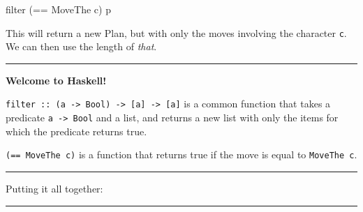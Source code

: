 \documentclass[]{article}
\newenvironment{Shaded}{}{}
\newcommand{\KeywordTok}[1]{\textcolor[rgb]{0.00,0.44,0.13}{\textbf{{#1}}}}
\newcommand{\DataTypeTok}[1]{\textcolor[rgb]{0.56,0.13,0.00}{{#1}}}
\newcommand{\OtherTok}[1]{\textcolor[rgb]{0.00,0.44,0.13}{{#1}}}
\newcommand{\FunctionTok}[1]{\textcolor[rgb]{0.02,0.16,0.49}{{#1}}}
\newcommand{\NormalTok}[1]{{#1}}
\begin{document}
\begin{Shaded}
\begin{Highlighting}[]
\NormalTok{filter (}\FunctionTok{==} \DataTypeTok{MoveThe} \NormalTok{c) p}
\end{Highlighting}
\end{Shaded}

This will return a new Plan, but with only the moves involving the
character \texttt{c}. We can then use the length of \emph{that}.

\begin{center}\rule{0.5\linewidth}{\linethickness}\end{center}

\textbf{Welcome to Haskell!}

\texttt{filter\ ::\ (a\ -\textgreater{}\ Bool)\ -\textgreater{}\ {[}a{]}\ -\textgreater{}\ {[}a{]}}
is a common function that takes a predicate
\texttt{a\ -\textgreater{}\ Bool} and a list, and returns a new list
with only the items for which the predicate returns true.

\texttt{(==\ MoveThe\ c)} is a function that returns true if the move is
equal to \texttt{MoveThe\ c}.

\begin{center}\rule{0.5\linewidth}{\linethickness}\end{center}

Putting it all together:

\begin{Shaded}
\end{Shaded}

\begin{center}\rule{0.5\linewidth}{\linethickness}\end{center}
\end{document}
